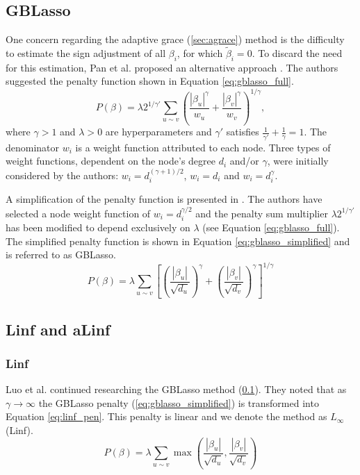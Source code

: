 \subsection{GBLasso} \label{sec:gblasso}
One concern regarding the adaptive grace (\ref{sec:agrace}) method is the difficulty to estimate the sign adjustment of all $\beta_i$, for which $\tilde{\beta}_i = 0$. To discard the need for this estimation, Pan et al. proposed an alternative approach \cite{pan2010incorporating}. The authors suggested the penalty function shown in Equation \ref{eq:gblasso_full}. 
\begin{equation} \label{eq:gblasso_full}
P(\beta) = \lambda 2^{1/\gamma'}\sum_{u \sim v}\left(\frac{|\beta_u|^\gamma}{w_u}+\frac{|\beta_v|^\gamma}{w_v}\right)^{1/\gamma},
\end{equation}
where $\gamma > 1$ and $\lambda > 0$ are hyperparameters and $\gamma'$ satisfies $\frac{1}{\gamma'}+\frac{1}{\gamma}=1$. The denominator $w_i$ is a weight function attributed to each node. Three types of weight functions, dependent on the node's degree $d_i$ and/or $\gamma$, were initially considered by the authors: $w_i = d_i^{(\gamma+1)/2}$, $w_i = d_i$ and $w_i = d_i^\gamma$. 

A simplification of the penalty function is presented in \cite{luo2012two}. The authors have selected a node weight function of $w_i = d_i^{\gamma/2}$ and the penalty sum multiplier $\lambda2^{1/\gamma'}$ has been modified to depend exclusively on $\lambda$ (see Equation \ref{eq:gblasso_full}). The simplified penalty function is shown in Equation \ref{eq:gblasso_simplified} and is referred to as GBLasso.
\begin{equation} \label{eq:gblasso_simplified}
P(\beta) = \lambda\sum_{u \sim v}
\left[\left(\frac{|\beta_u|}{\sqrt{d_u}}\right)^\gamma+
\left(\frac{|\beta_v|}{\sqrt{d_v}}\right)^\gamma\right]^{1/\gamma}
\end{equation}



\subsection{Linf and aLinf}

\subsubsection{Linf} \label{sec:linf}
Luo et al. \cite{luo2012two} continued researching the GBLasso method (\ref{sec:gblasso}). They noted that as $\gamma\rightarrow\infty$ the GBLasso penalty (\ref{eq:gblasso_simplified}) is transformed into Equation \ref{eq:linf_pen}. This penalty is linear and we denote the method as $L_\infty$ (Linf). 
\begin{equation} \label{eq:linf_pen}
P(\beta) = \lambda\sum_{u \sim v}\max\left(\frac{|\beta_u|}{\sqrt{d_u}},\frac{|\beta_v|}{\sqrt{d_v}}\right)
\end{equation}


